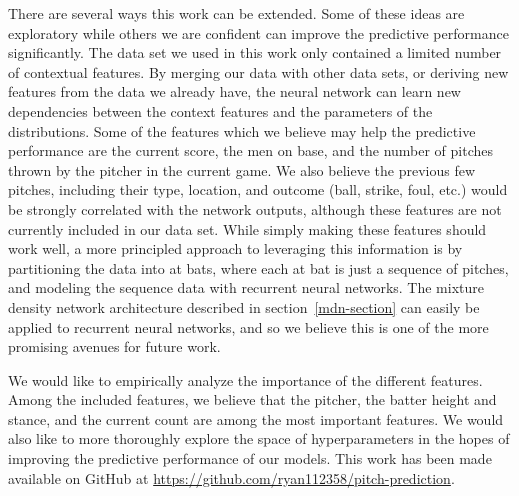 \documentclass{article}
\begin{document}
There are several ways this work can be extended.  Some of these ideas are exploratory while others we are confident can improve the predictive performance significantly.  The data set we used in this work only contained a limited number of contextual features.  By merging our data with other data sets, or deriving new features from the data we already have, the neural network can learn new dependencies between the context features and the parameters of the distributions.  Some of the features which we believe may help the predictive performance are the current score, the men on base, and the number of pitches thrown by the pitcher in the current game.  We also believe the previous few pitches, including their type, location, and outcome (ball, strike, foul, etc.) would be strongly correlated with the network outputs, although these features are not currently included in our data set.  While simply making these features should work well, a more principled approach to leveraging this information is by partitioning the data into at bats, where each at bat is just a sequence of pitches, and modeling the sequence data with recurrent neural networks.  The mixture density network architecture described in section~\ref{mdn-section} can easily be applied to recurrent neural networks, and so we believe this is one of the more promising avenues for future work.  

We would like to empirically analyze the importance of the different features.  Among the included features, we believe that the pitcher, the batter height and stance, and the current count are among the most important features.  We would also like to more thoroughly explore the space of hyperparameters in the hopes of improving the predictive performance of our models.  This work has been made available on GitHub at \url{https://github.com/ryan112358/pitch-prediction}.



\end{document}
